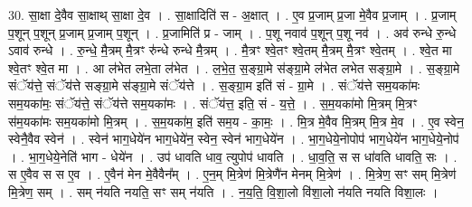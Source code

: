 \documentclass[17pt]{extarticle}
\begin{document}
30. सा॒क्षा दे॒वैव सा॒क्षाथ् सा॒क्षा दे॒व । . सा॒क्षादिति॑ स - अ॒क्षात् । . ए॒व प्र॒जाम् प्र॒जा मे॒वैव प्र॒जाम् । . प्र॒जाम् प॒शून् प॒शून् प्र॒जाम् प्र॒जाम् प॒शून् । . प्र॒जामिति॑ प्र - जाम् । . प॒शू नवाव॑ प॒शून् प॒शू नव॑ । . अव॑ रुन्धे रु॒न्धे ऽवाव॑ रुन्धे । . रु॒न्धे॒ मै॒त्रम् मै॒त्रꣳ रु॑न्धे रुन्धे मै॒त्रम् । . मै॒त्रꣳ श्वे॒तꣳ श्वे॒तम् मै॒त्रम् मै॒त्रꣳ श्वे॒तम् । . श्वे॒त मा श्वे॒तꣳ श्वे॒त मा । . आ ल॑भेत लभे॒ता ल॑भेत । . ल॒भे॒त॒ स॒ङ्ग्रा॒मे स॑ङ्ग्रा॒मे ल॑भेत लभेत सङ्ग्रा॒मे । . स॒ङ्ग्रा॒मे संॅय॑त्ते॒ संॅय॑त्ते सङ्ग्रा॒मे स॑ङ्ग्रा॒मे संॅय॑त्ते । . स॒ङ्ग्रा॒म इति॑ सं - ग्रा॒मे । . संॅय॑त्ते सम॒यका॑मः सम॒यका॑मः॒ संॅय॑त्ते॒ संॅय॑त्ते सम॒यका॑मः । . संॅय॑त्त॒ इति॒ सं - य॒त्ते॒ । . स॒म॒यका॑मो मि॒त्रम् मि॒त्रꣳ स॑म॒यका॑मः सम॒यका॑मो मि॒त्रम् । . स॒म॒यका॑म॒ इति॑ सम॒य - का॒मः॒ । . मि॒त्र मे॒वैव मि॒त्रम् मि॒त्र मे॒व । . ए॒व स्वेन॒ स्वेनै॒वैव स्वेन॑ । . स्वेन॑ भाग॒धेये॑न भाग॒धेये॑न॒ स्वेन॒ स्वेन॑ भाग॒धेये॑न । . भा॒ग॒धेये॒नोपोप॑ भाग॒धेये॑न भाग॒धेये॒नोप॑ । . भा॒ग॒धेये॒नेति॑ भाग - धेये॑न । . उप॑ धावति धाव॒ त्युपोप॑ धावति । . धा॒व॒ति॒ स स धा॑वति धावति॒ सः । . स ए॒वैव स स ए॒व । . ए॒वैन॑ मेन मे॒वैवैन᳚म् । . ए॒न॒म् मि॒त्रेण॑ मि॒त्रेणै॑न मेनम् मि॒त्रेण॑ । . मि॒त्रेण॒ सꣳ सम् मि॒त्रेण॑ मि॒त्रेण॒ सम् । . सम् न॑यति नयति॒ सꣳ सम् न॑यति । . न॒य॒ति॒ वि॒शा॒लो वि॑शा॒लो न॑यति नयति विशा॒लः । \newline
\end{document}
